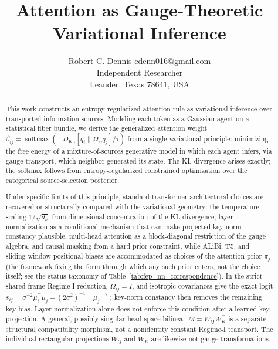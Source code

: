 \documentclass[twoside,11pt]{article}
\begin{document}

\title{Attention as Gauge-Theoretic Variational Inference}

\author{\name Robert C. Dennis \email cdenn016@gmail.com \\
  \addr Independent Researcher\\
  \addr Leander, Texas 78641, USA}


\maketitle

\begin{abstract}
This work constructs an entropy-regularized attention rule as variational inference over transported information sources. Modeling each token as a Gaussian agent on a statistical fiber bundle, we derive the generalized attention weight $\beta_{ij} = \operatorname{softmax}(-D_{\mathrm{KL}}[q_i \| \Omega_{ij} q_j] / \tau)$ from a single variational principle: minimizing the free energy of a mixture-of-sources generative model in which each agent infers, via gauge transport, which neighbor generated its state. The KL divergence arises exactly; the softmax follows from entropy-regularized constrained optimization over the categorical source-selection posterior.

Under specific limits of this principle, standard transformer architectural choices are recovered or structurally compared with the variational geometry: the temperature scaling $1/\sqrt{d_k}$ from dimensional concentration of the KL divergence, layer normalization as a conditional mechanism that can make projected-key norm constancy plausible, multi-head attention as a block-diagonal restriction of the gauge algebra, and causal masking from a hard prior constraint, while ALiBi, T5, and sliding-window positional biases are accommodated as choices of the attention prior $\pi_j$ (the framework fixing the form through which any such prior enters, not the choice itself; see the status taxonomy of Table~\ref{tab:fep_nn_correspondence}). In the strict shared-frame Regime-I reduction, $\Omega_{ij} = I$, and isotropic covariances give the exact logit $\widetilde s_{ij} = \sigma^{-2}\mu_i^\top\mu_j - (2\sigma^2)^{-1}\|\mu_j\|^2$; key-norm constancy then removes the remaining key bias. Layer normalization alone does not enforce this condition after a learned key projection. A general, possibly singular head-space bilinear $M = W_QW_K^\top$ is a separate structural compatibility morphism, not a nonidentity constant Regime-I transport. The individual rectangular projections $W_Q$ and $W_K$ are likewise not gauge transformations.


\end{abstract}
\end{document}
